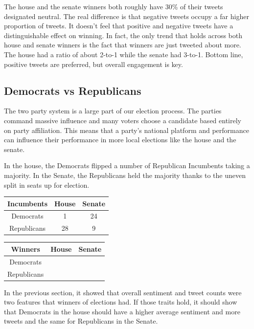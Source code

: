 \documentclass[11pt, twoside, reqno]{article}
\begin{document}
The house and the senate winners both roughly have 30\% of their tweets designated neutral. The real difference is that negative tweets occupy a far higher proportion of tweets. It doesn't feel that positive and negative tweets have a distinguishable effect on winning. In fact, the only trend that holds across both house and senate winners is the fact that winners are just tweeted about more. The house had a ratio of about 2-to-1 while the senate had 3-to-1. Bottom line, positive tweets are preferred, but overall engagement is key. 

\subsection{Democrats vs Republicans}
The two party system is a large part of our election process. The parties command massive influence and many voters choose a candidate based entirely on party affiliation. This means that a party's national platform and performance can influence their performance in more local elections like the house and the senate. 

In the house, the Democrats flipped a number of Republican Incumbents taking a majority. In the Senate, the Republicans held the majority thanks to the uneven split in seats up for election.

\begin{center}
\begin{tabular}{|c|c|c|}
	\hline
	Incumbents & House & Senate \\
	\hline
	Democrats & 1 & 24\\
	\hline
	Republicans & 28 & 9\\
	\hline
\end{tabular}
\end{center}

\begin{center}
\begin{tabular}{|c|c|c|}
	\hline
	Winners & House & Senate \\
	\hline
	Democrats &  &  \\
	\hline
	Republicans &  &  \\
	\hline
\end{tabular}
\end{center}

In the previous section, it showed that overall sentiment and tweet counts were two features that winners of elections had. If those traits hold, it should show that Democrats in the house should have a higher average sentiment and more tweets and the same for Republicans in the Senate. 
\end{document}
